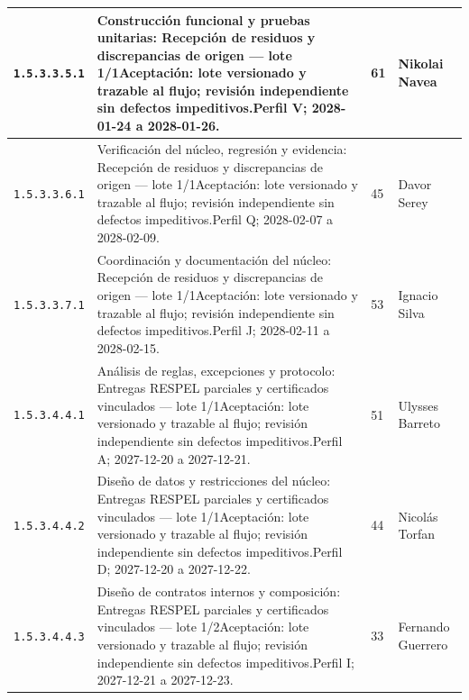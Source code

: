 \begin{longtable}{L{29mm}L{80mm}R{12mm}L{28mm}}
\texttt{1.\allowbreak{}5.\allowbreak{}3.\allowbreak{}3.\allowbreak{}5.\allowbreak{}1} & Construcción funcional y pruebas unitarias: Recepción de residuos y discrepancias de origen — lote 1/1\newline Aceptación: lote versionado y trazable al flujo; revisión independiente sin defectos impeditivos.\newline Perfil V; 2028-01-24 a 2028-01-26. & 61 & Nikolai Navea\\\hline
\texttt{1.\allowbreak{}5.\allowbreak{}3.\allowbreak{}3.\allowbreak{}6.\allowbreak{}1} & Verificación del núcleo, regresión y evidencia: Recepción de residuos y discrepancias de origen — lote 1/1\newline Aceptación: lote versionado y trazable al flujo; revisión independiente sin defectos impeditivos.\newline Perfil Q; 2028-02-07 a 2028-02-09. & 45 & Davor Serey\\\hline
\texttt{1.\allowbreak{}5.\allowbreak{}3.\allowbreak{}3.\allowbreak{}7.\allowbreak{}1} & Coordinación y documentación del núcleo: Recepción de residuos y discrepancias de origen — lote 1/1\newline Aceptación: lote versionado y trazable al flujo; revisión independiente sin defectos impeditivos.\newline Perfil J; 2028-02-11 a 2028-02-15. & 53 & Ignacio Silva\\\hline
\texttt{1.\allowbreak{}5.\allowbreak{}3.\allowbreak{}4.\allowbreak{}4.\allowbreak{}1} & Análisis de reglas, excepciones y protocolo: Entregas RESPEL parciales y certificados vinculados — lote 1/1\newline Aceptación: lote versionado y trazable al flujo; revisión independiente sin defectos impeditivos.\newline Perfil A; 2027-12-20 a 2027-12-21. & 51 & Ulysses Barreto\\\hline
\texttt{1.\allowbreak{}5.\allowbreak{}3.\allowbreak{}4.\allowbreak{}4.\allowbreak{}2} & Diseño de datos y restricciones del núcleo: Entregas RESPEL parciales y certificados vinculados — lote 1/1\newline Aceptación: lote versionado y trazable al flujo; revisión independiente sin defectos impeditivos.\newline Perfil D; 2027-12-20 a 2027-12-22. & 44 & Nicolás Torfan\\\hline
\texttt{1.\allowbreak{}5.\allowbreak{}3.\allowbreak{}4.\allowbreak{}4.\allowbreak{}3} & Diseño de contratos internos y composición: Entregas RESPEL parciales y certificados vinculados — lote 1/2\newline Aceptación: lote versionado y trazable al flujo; revisión independiente sin defectos impeditivos.\newline Perfil I; 2027-12-21 a 2027-12-23. & 33 & Fernando Guerrero\\\hline

\end{longtable}
